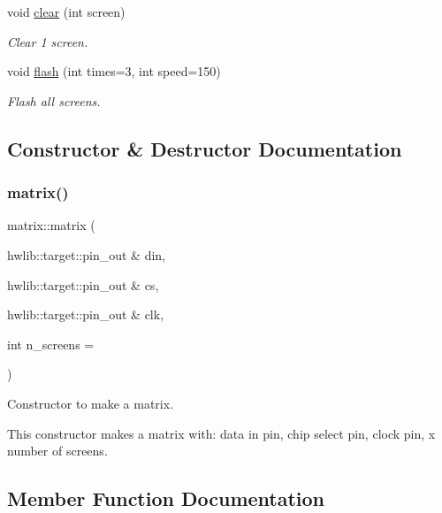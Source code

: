 \begin{DoxyCompactItemize}
void \hyperlink{classmatrix_a0af6c04210bda572dcbaeb6e91c20861}{clear} (int screen)
\begin{DoxyCompactList}\small\item\em Clear 1 screen. \end{DoxyCompactList}\item 
void \hyperlink{classmatrix_a8403a5d8bc178bf856a1a2658a8f8656}{flash} (int times=3, int speed=150)
\begin{DoxyCompactList}\small\item\em Flash all screens. \end{DoxyCompactList}\end{DoxyCompactItemize}


\subsection{Constructor \& Destructor Documentation}
\mbox{\label{classmatrix_a03241010eb16439dc4cb6a4d9853b7e3}} 
\subsubsection{\texorpdfstring{matrix()}{matrix()}}
{\footnotesize\ttfamily matrix\+::matrix (\begin{DoxyParamCaption}\item[{hwlib\+::target\+::pin\+\_\+out \&}]{din,  }\item[{hwlib\+::target\+::pin\+\_\+out \&}]{cs,  }\item[{hwlib\+::target\+::pin\+\_\+out \&}]{clk,  }\item[{int}]{n\+\_\+screens = {} }\end{DoxyParamCaption})\hspace{0.3cm}{\ttfamily [inline]}}



Constructor to make a matrix. 

This constructor makes a matrix with\+: data in pin, chip select pin, clock pin, \textquotesingle{}x\textquotesingle{} number of screens. 

\subsection{Member Function Documentation}
\mbox{\label{classmatrix_a0af6c04210bda572dcbaeb6e91c20861}} 
